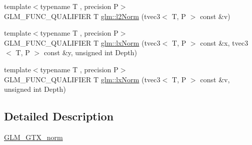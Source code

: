 \begin{DoxyCompactItemize}
\item 
{\footnotesize template$<$typename T , precision P$>$ }\\G\+L\+M\+\_\+\+F\+U\+N\+C\+\_\+\+Q\+U\+A\+L\+I\+F\+I\+ER T \hyperlink{group__gtx__norm_ga0a8cb8a0ce88d1d977de23209bf04610}{glm\+::l2\+Norm} (tvec3$<$ T, P $>$ const \&v)
\item 
{\footnotesize template$<$typename T , precision P$>$ }\\G\+L\+M\+\_\+\+F\+U\+N\+C\+\_\+\+Q\+U\+A\+L\+I\+F\+I\+ER T \hyperlink{group__gtx__norm_ga932bb0854e5c5a6ab5a14b023c451ca7}{glm\+::lx\+Norm} (tvec3$<$ T, P $>$ const \&x, tvec3$<$ T, P $>$ const \&y, unsigned int Depth)
\item 
{\footnotesize template$<$typename T , precision P$>$ }\\G\+L\+M\+\_\+\+F\+U\+N\+C\+\_\+\+Q\+U\+A\+L\+I\+F\+I\+ER T \hyperlink{group__gtx__norm_gaab931b0d1acfe2f9c1cb78311edf24fc}{glm\+::lx\+Norm} (tvec3$<$ T, P $>$ const \&v, unsigned int Depth)
\end{DoxyCompactItemize}


\subsection{Detailed Description}
\hyperlink{group__gtx__norm}{G\+L\+M\+\_\+\+G\+T\+X\+\_\+norm} 